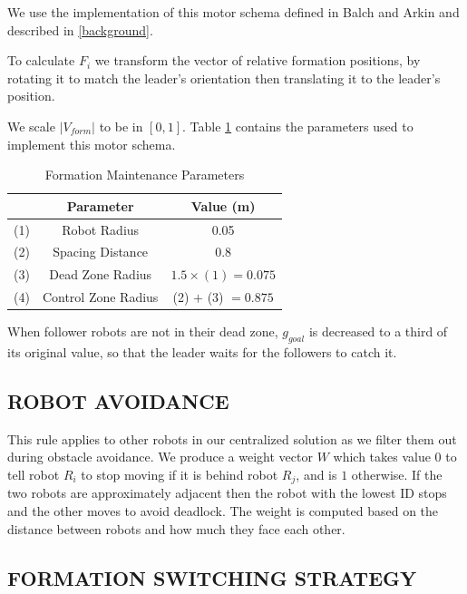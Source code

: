 \documentclass[letterpaper, 10 pt, conference]{ieeeconf}  %
\begin{document}
We use the implementation of this motor schema defined in Balch and Arkin and described in \ref{background}. 

To calculate $F_i$ we transform the vector of relative formation positions, by rotating it to match the leader's orientation then translating it to the leader's position.

We scale $|V_{form}|$ to be in $[0, 1]$. Table \ref{table_formation} contains the parameters used to implement this motor schema.

\begin{table}[h]
\caption{Formation Maintenance Parameters}
\label{table_formation}
\begin{center}
\begin{tabular}{|c|c|c|}
\hline
& Parameter & Value (m) \\
\hline
(1) & Robot Radius             & 0.05 \\
(2) & Spacing Distance        & 0.8 \\
(3) & Dead Zone Radius      & $1.5 \times (1) = 0.075$ \\
(4) & Control Zone Radius    & (2) $+$ (3) $=0.875$ \\
\hline
\end{tabular}
\end{center}
\end{table}

When follower robots are not in their dead zone, $g_{goal}$ is decreased to a third of its original value, so that the leader waits for the followers to catch it.

\subsection{ROBOT AVOIDANCE}

This rule applies to other robots in our centralized solution as we filter them out during obstacle avoidance. We produce a weight vector $W$ which takes value $0$ to tell robot $R_i$ to stop moving if it is behind robot $R_j$, and is $1$ otherwise. If the two robots are approximately adjacent then the robot with the lowest ID stops and the other moves to avoid deadlock. The weight is computed based on the distance between robots and how much they face each other.

\subsection{FORMATION SWITCHING STRATEGY}
\end{document}
